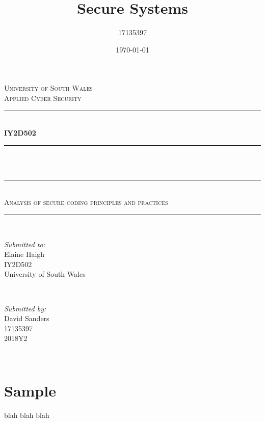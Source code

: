 \documentclass[12pt]{article}
\title{Secure Systems}
\author{17135397}
\date{\today}
\makeatletter
\let\thetitle\@title
\makeatother
\begin{document}

\begin{titlepage}
	\centering
  \textsc{\LARGE University of South Wales\\\Large Applied Cyber Security}\\[2cm]

  \rule{\linewidth}{0.2 mm} \\[0.5cm]
  { \huge \bfseries IY2D502}\\
	\rule{\linewidth}{0.2 mm} \\[0.5cm]
	{ \huge \bfseries \thetitle}\\
	\rule{\linewidth}{0.2 mm} \\[0.5cm]
  \textsc{\Large Analysis of secure coding principles and practices}\\
  \rule{\linewidth}{0.2 mm} \\[2cm]

	\begin{minipage}{0.4\textwidth}
		\begin{flushleft} \large
			\textit{Submitted to:}\\
			Elaine Haigh\\
        IY2D502\\
        University of South Wales\\
			\end{flushleft}
			\end{minipage}~
			\begin{minipage}{0.4\textwidth}

			\begin{flushright} \large
			\textit{Submitted by:} \\
			David Sanders\\
            17135397\\
            2018Y2\\
		\end{flushright}
	\end{minipage}\\[2 cm]

\end{titlepage}


\tableofcontents
\pagebreak


\section{Sample}
blah blah blah
\end{document}
